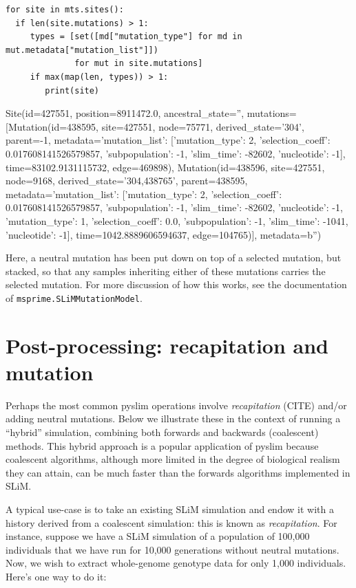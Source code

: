 \documentclass[12pt]{article}
\begin{document}
\begin{listing}[H]
    \begin{verbatim}
for site in mts.sites():
  if len(site.mutations) > 1:
     types = [set([md["mutation_type"] for md in mut.metadata["mutation_list"]])
              for mut in site.mutations]
     if max(map(len, types)) > 1:
        print(site)
    \end{verbatim}
\end{listing}
\begin{pycon}
Site(id=427551, position=8911472.0, ancestral_state='', mutations=[Mutation(id=438595, site=427551, node=75771, derived_state='304', parent=-1, metadata={'mutation_list': [{'mutation_type': 2, 'selection_coeff': 0.017608141526579857, 'subpopulation': -1, 'slim_time': -82602, 'nucleotide': -1}]}, time=83102.9131115732, edge=469898), Mutation(id=438596, site=427551, node=9168, derived_state='304,438765', parent=438595, metadata={'mutation_list': [{'mutation_type': 2, 'selection_coeff': 0.017608141526579857, 'subpopulation': -1, 'slim_time': -82602, 'nucleotide': -1}, {'mutation_type': 1, 'selection_coeff': 0.0, 'subpopulation': -1, 'slim_time': -1041, 'nucleotide': -1}]}, time=1042.8889606594637, edge=104765)], metadata=b'')
\end{pycon}

Here, a neutral mutation has been put down on top of a selected mutation, but stacked,
so that any samples inheriting either of these mutations carries the selected mutation.
For more discussion of how this works, see  the documentation of \verb|msprime.SLiMMutationModel|.



\section*{Post-processing: recapitation and mutation}

Perhaps the most common pyslim operations involve \textit{recapitation} (CITE)
and/or adding neutral mutations.
Below we illustrate these in the context of running a ``hybrid'' simulation, combining
both forwards and backwards (coalescent) methods. This hybrid approach is a popular
application of pyslim because coalescent algorithms, although more limited in the degree
of biological realism they can attain, can be much faster than the forwards algorithms
implemented in SLiM.

A typical use-case is to take an existing SLiM simulation and endow
it with a history derived from a coalescent simulation: this is known as \textit{recapitation}.
For instance, suppose we have a SLiM simulation of a population of 100,000 individuals
that we have run for 10,000 generations without neutral mutations. Now, we wish to
extract whole-genome genotype data for only 1,000 individuals. Here's one way to do it:
\end{document}
